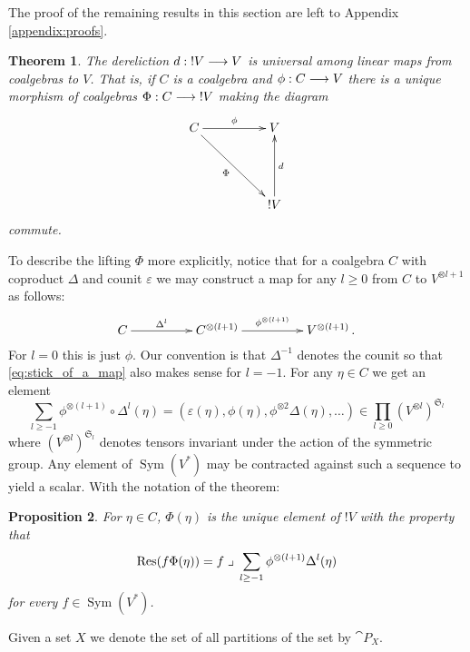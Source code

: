 \documentclass[english,letter paper,12pt,reqno]{article}
\newtheorem{theorem}{Theorem}[section]
\newtheorem{proposition}[theorem]{Proposition}
\theoremstyle{example}
\numberwithin{equation}{section}
\DeclareMathOperator{\Sym}{Sym}
\begin{document}
The proof of the remaining results in this section are left to Appendix \ref{appendix:proofs}.

\begin{theorem}\label{theorem:main} The dereliction $d: {!}V \longrightarrow V$ is universal among linear maps from coalgebras to $V$. That is, if $C$ is a coalgebra and $\phi: C \longrightarrow V$ there is a unique morphism of coalgebras $\Phi: C \longrightarrow {!}V$ making the diagram
\begin{equation}\label{eq:defining_philift2}
\xymatrix@C+2pc@R+2pc{
C \ar[r]^-{\phi}\ar[dr]_-{\Phi} & V\\
& {!}V \ar[u]_-{d}
}
\end{equation}
commute.
\end{theorem}

To describe the lifting $\Phi$ more explicitly, notice that for a coalgebra $C$ with coproduct $\Delta$ and counit $\varepsilon$ we may construct a map for any $l \ge 0$ from $C$ to $V^{\otimes l+1}$ as follows:
\begin{equation}\label{eq:stick_of_a_map}
\xymatrix@C+2pc{
C \ar[r]^-{\Delta^l} & C^{\otimes (l+1)} \ar[r]^-{\phi^{\otimes (l+1)}} & V^{\otimes (l+1)}\,.
}
\end{equation}
For $l = 0$ this is just $\phi$. Our convention is that $\Delta^{-1}$ denotes the counit so that \eqref{eq:stick_of_a_map} also makes sense for $l = -1$. For any $\eta \in C$ we get an element
\begin{equation}\label{eq:sequence_of_powers}
\sum_{l \ge -1} \phi^{\otimes (l+1)} \circ \Delta^l(\eta) = ( \varepsilon(\eta), \phi(\eta), \phi^{\otimes 2} \Delta(\eta), \ldots ) \in \prod_{l \ge 0} (V^{\otimes l})^{\mathfrak{S}_l}
\end{equation}
where $(V^{\otimes l})^{\mathfrak{S}_l}$ denotes tensors invariant under the action of the symmetric group. Any element of $\Sym(V^*)$ may be contracted against such a sequence to yield a scalar. With the notation of the theorem:

\begin{proposition}\label{prop:respairing} For $\eta \in C$, $\Phi(\eta)$ is the unique element of ${!}V$ with the property that
\begin{equation}\label{eq:respairing}
\operatorname{Res}\!\,( f \Phi(\eta) ) = f\; \lrcorner \;\sum_{l \ge -1} \phi^{\otimes (l+1)} \Delta^l(\eta)
\end{equation}
for every $f \in \Sym(V^*)$.
\end{proposition}

Given a set $X$ we denote the set of all partitions of the set by $\cat{P}_X$.
\end{document}
